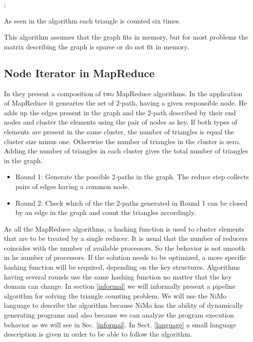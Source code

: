 \documentclass{article}                     \usepackage{graphics}
\begin{document}
;

As seen in the algorithm each triangle is counted six times.

This algorithm assumes that the graph fits in memory, but for most problems the matrix describing the graph  is sparse or do not fit in memory.  
\subsection{Node Iterator in MapReduce}

In \cite{Suri:2011:CTC:1963405.1963491}  they present a composition of  two  MapReduce algorithms. In the application of MapReduce it geneartes  the set of 2-path, having a given responsible node.  He adds up the edges present in the graph and  the 2-path described by  their end nodes and cluster the elements using the pair of nodes as key. If both types of elements  are present in the same cluster, the number of triangles is equal the cluster size minus one. Otherwise the number of triangles in the cluster is zero. Adding the number of triangles in each cluster gives the total  number of triangles in the graph.  
\begin{itemize}
\item Round 1: Generate the possible  2-paths in
the graph.  The reduce step collects pairs of edges having a common node.
\item Round 2: Check which of the the 2-paths generated
in Round 1 can be closed by an edge in the graph
and count the triangles accordingly.
\end{itemize}

As all the MapReduce algorithms, a hashing function is used  to cluster elements that are to be treated by a single reducer.  It is usual that the number of reducers coincides with the number of available processors. So the behavior is not smooth   in he number of processors.  If the solution needs to be optimized, a more specific hashing function will be required, depending on the key structures. Algorithms having several rounds use the same hashing function no matter that the key domain can change.   In section \ref{informal} we will informally  present a pipeline algorithm for solving the triangle counting problem. We will use the  NiMo language to describe the algorithm because NiMo has the ability of dynamically generating programs and also because we can analyze the program execution  behavior as we will see in Sec. \ref{informal}. In Sect. \ref{language} a small language description is given in order to be able to follow the algorithm.
\end{document}
